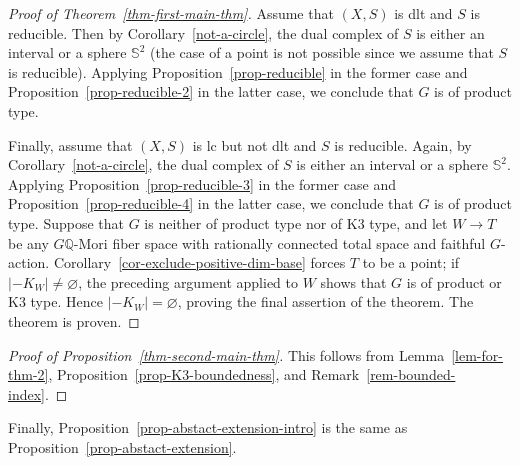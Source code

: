 \documentclass[11pt]{amsart}
\numberwithin{equation}{section}
\theoremstyle{definition}
\theoremstyle{remark}
\let\emptyset\varnothing
\begin{document}
\begin{proof}[Proof of Theorem~\ref{thm-first-main-thm}]
Assume that $(X, S)$ is dlt and $S$ is reducible. Then by Corollary~\ref{not-a-circle}, the dual complex of $S$ is either an interval or a sphere $\mathbb{S}^2$ (the case of a point is not possible since we assume that $S$ is reducible). Applying Proposition~\ref{prop-reducible} in the former case and Proposition~\ref{prop-reducible-2} in the latter case, we conclude that $G$ is of product type. 

Finally, assume that $(X,S)$ is lc but not dlt and $S$ is reducible. Again, by Corollary~\ref{not-a-circle}, the dual complex of $S$ is either an interval or a sphere $\mathbb{S}^2$. Applying Proposition~\ref{prop-reducible-3} in the former case and Proposition~\ref{prop-reducible-4} in the latter case, we conclude that $G$ is of product type. Suppose that $G$ is neither of product type nor of K3 type, and let $W\to T$ be any $G\mathbb Q$-Mori fiber space with rationally connected total space and faithful $G$-action. Corollary~\ref{cor-exclude-positive-dim-base} forces $T$ to be a point; if $|-K_W|\ne\emptyset$, the preceding argument applied to $W$ shows that $G$ is of product or K3 type. Hence $|-K_W|=\emptyset$, proving the final assertion of the theorem. The theorem is proven. 
\end{proof}

\begin{proof}[Proof of Proposition~\ref{thm-second-main-thm}]
This follows from Lemma~\ref{lem-for-thm-2}, Proposition~\ref{prop-K3-boundedness}, and Remark~\ref{rem-bounded-index}.
 \end{proof}
 
Finally, Proposition~\ref{prop-abstact-extension-intro} is the same as Proposition~\ref{prop-abstact-extension}. 

\end{document}

